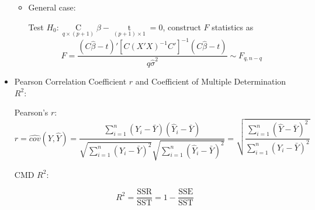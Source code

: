 \begin{itemize}[topsep=2pt,itemsep=2pt]
\begin{itemize}[topsep=2pt,itemsep=2pt]
        \item \hypertarget{HyperlinkGLT}{General case:} Test $ H_0: \mathop{C}\limits_{q\times (p+1)} \beta -\mathop{t}\limits_{(p+1)\times 1} =0 $, construct $ F $ statistics as
        \begin{equation}
            F=\dfrac{ (C\hat{\beta }-t)'\left[C(X'X)^{-1}C'\right]^{-1}(C\hat{\beta }-t)  }{q\hat{\sigma }^2 }\sim F_{q,n-q  } 
        \end{equation}
        
        
        


    





    \end{itemize}
    
        






\item Pearson Correlation Coefficient $ r $ and Coefficient of Multiple Determination $ R^2 $:


    Pearson's $ r $:
    \begin{equation}
        r=\hat{cov}(Y,\hat{Y})=\dfrac{\sum\limits_{i=1}^n(Y_i-\bar{Y})(\hat{Y}_i-\bar{Y})}{\sqrt{\sum\limits_{i=1}^n(Y_i-\bar{Y})^2}\sqrt{\sum\limits_{i=1}^n(\hat{Y}_i-\bar{Y})^2}}=\sqrt{\dfrac{\sum\limits_{i=1}^n(\hat{Y}-\bar{Y})^2}{\sum\limits_{i=1}^n(Y_i-\bar{Y})^2}}
    \end{equation}
    
    CMD $ R^2 $:

    \begin{equation}
        R^2=\dfrac{\mathrm{SSR}}{\mathrm{SST}}=1-\dfrac{\mathrm{SSE}}{\mathrm{SST}}
    \end{equation}


\end{itemize}
